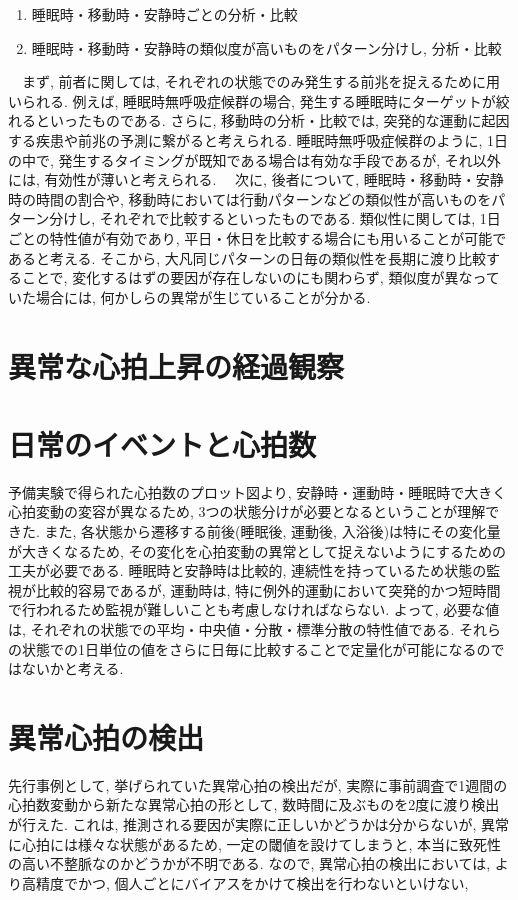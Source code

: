 \documentclass[report, 11pt, a4paper]{jsbook}
\begin{document}
\begin{enumerate}
  \item 睡眠時・移動時・安静時ごとの分析・比較
  \item 睡眠時・移動時・安静時の類似度が高いものをパターン分けし, 分析・比較
\end{enumerate}

　まず, 前者に関しては, それぞれの状態でのみ発生する前兆を捉えるために用いられる. 例えば, 睡眠時無呼吸症候群の場合, 発生する睡眠時にターゲットが絞れるといったものである. さらに, 移動時の分析・比較では, 突発的な運動に起因する疾患や前兆の予測に繋がると考えられる. 睡眠時無呼吸症候群のように, 1日の中で, 発生するタイミングが既知である場合は有効な手段であるが, それ以外には, 有効性が薄いと考えられる.
　次に, 後者について, 睡眠時・移動時・安静時の時間の割合や, 移動時においては行動パターンなどの類似性が高いものをパターン分けし, それぞれで比較するといったものである. 類似性に関しては, 1日ごとの特性値が有効であり, 平日・休日を比較する場合にも用いることが可能であると考える. そこから, 大凡同じパターンの日毎の類似性を長期に渡り比較することで, 変化するはずの要因が存在しないのにも関わらず, 類似度が異なっていた場合には, 何かしらの異常が生じていることが分かる. 

\section{異常な心拍上昇の経過観察}


\section{日常のイベントと心拍数}
予備実験で得られた心拍数のプロット図より, 安静時・運動時・睡眠時で大きく心拍変動の変容が異なるため, 3つの状態分けが必要となるということが理解できた. また, 各状態から遷移する前後(睡眠後, 運動後, 入浴後)は特にその変化量が大きくなるため, その変化を心拍変動の異常として捉えないようにするための工夫が必要である. 睡眠時と安静時は比較的, 連続性を持っているため状態の監視が比較的容易であるが, 運動時は, 特に例外的運動において突発的かつ短時間で行われるため監視が難しいことも考慮しなければならない. よって, 必要な値は, それぞれの状態での平均・中央値・分散・標準分散の特性値である. それらの状態での1日単位の値をさらに日毎に比較することで定量化が可能になるのではないかと考える.  

\section{異常心拍の検出}
先行事例として, 挙げられていた異常心拍の検出だが, 実際に事前調査で1週間の心拍数変動から新たな異常心拍の形として, 数時間に及ぶものを2度に渡り検出が行えた. 
これは, 推測される要因が実際に正しいかどうかは分からないが, 異常に心拍には様々な状態があるため, 一定の閾値を設けてしまうと, 本当に致死性の高い不整脈なのかどうかが不明である. なので, 異常心拍の検出においては, より高精度でかつ, 個人ごとにバイアスをかけて検出を行わないといけない,
\end{document}
